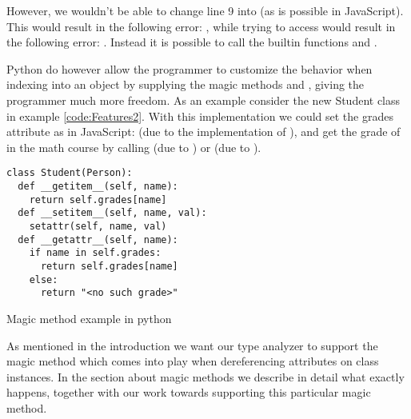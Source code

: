 However, we wouldn't be able to change line 9 into  (as is possible in JavaScript). This would result in the following error: 
, while trying to access  would result in the following error: 
. Instead it is possible to call the builtin functions 
 and .

Python do however allow the programmer to customize the behavior when indexing into an object by supplying the magic methods
 and , giving the programmer much more freedom. 
As an example consider the new Student class in example \ref{code:Features2}. 
With this implementation we could set the grades attribute as in JavaScript:  (due to the implementation of ), 
and get the grade of  in the math course by calling  (due to ) or  (due to ).

\begin{listing}[H]
\begin{verbatim}
class Student(Person):
  def __getitem__(self, name):
    return self.grades[name]
  def __setitem__(self, name, val):
    setattr(self, name, val)
  def __getattr__(self, name):
    if name in self.grades:
      return self.grades[name]
    else:
      return "<no such grade>"
\end{verbatim}
	\caption{Magic method example in python}
	\label{code:Features2}
\end{listing}

As mentioned in the introduction we want our type analyzer to support the magic method  which comes into play when dereferencing attributes on class instances. In the section about magic methods we describe in detail what exactly happens, together with our work towards supporting this particular magic method.